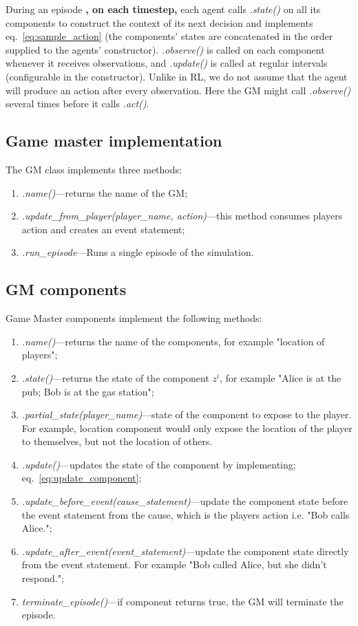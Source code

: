 \documentclass[11pt, a4paper, logo, twocolumn, internal, copyright, numbering]{googledeepmind}
\begin{document}
During an episode \textbf{, on each timestep,} each agent calls \textit{.state()} on all its components to construct the context of its next decision and implements eq.~\eqref{eq:sample_action} (the components' states are concatenated in the order supplied to the agents' constructor). \textit{.observe()} is called on each component whenever it receives observations, and  \textit{.update()} is called at regular intervals (configurable in the constructor). Unlike in RL, we do not assume that the agent will produce an action after every observation. Here the GM might call \textit{.observe()} several times before it calls \textit{.act()}.


\subsection{Game master implementation}

The GM class implements three methods:
\begin{enumerate}
    \item \textit{.name()}---returns the name of the GM;
    \item \textit{.update\_from\_player(player\_name, action)}---this method consumes players action and creates an event statement;
    \item \textit{.run\_episode}---Runs a single episode of the simulation.
\end{enumerate}

\subsection{GM components}

Game Master components implement the following methods:
\begin{enumerate}
    \item \textit{.name()}---returns the name of the components, for example "location of players";
    \item \textit{.state()}---returns the state of the component $z^i$, for example "Alice is at the pub; Bob is at the gas station";
    \item \textit{.partial\_state(player\_name)}---state of the component to expose to the player. For example, location component would only expose the location of the player to themselves, but not the location of others.
    \item \textit{.update()}---updates the state of the component by implementing; eq.~\eqref{eq:update_component};
    \item \textit{.update\_before\_event(cause\_statement)}---update the component state before the event statement from the cause, which is the players action i.e. "Bob calls Alice.";
    \item \textit{.update\_after\_event(event\_statement)}---update the component state directly from the event statement. For example "Bob called Alice, but she didn't respond.";
    \item \textit{terminate\_episode()}---if component returns true, the GM will terminate the episode.
\end{enumerate}
\end{document}
